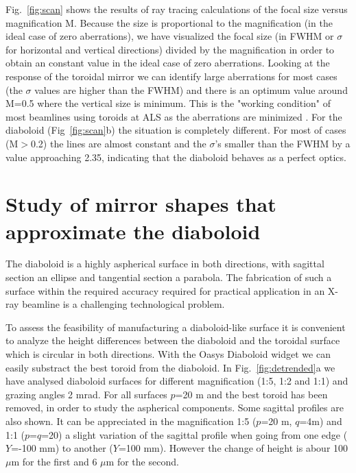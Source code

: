 \documentclass{iucr}              %
\begin{document}
Fig.~\ref{fig:scan} shows the results of ray tracing calculations of the focal size versus magnification M. Because the size is proportional to the magnification (in the ideal case of zero aberrations), we have visualized the focal size (in FWHM or $\sigma$ for horizontal and vertical directions) divided by the magnification in order to obtain an constant value in the ideal case of zero aberrations. Looking at the response of the toroidal mirror we can identify large aberrations for most cases (the $\sigma$ values are higher than the FWHM) and there is an optimum value around M=0.5 where the vertical size is minimum. This is the "working condition" of most beamlines using toroids at ALS as the aberrations are minimized \cite{MacDowell2004}. For the diaboloid (Fig~\ref{fig:scan}b) the situation is completely different. For most of cases (M$>$0.2) the lines are almost constant and the $\sigma$'s smaller than the FWHM by a value approaching 2.35, indicating that the diaboloid behaves as a perfect optics. 


\section{Study of mirror shapes that approximate the diaboloid}
\label{sec:approximatedShapes}

The diaboloid is a highly aspherical surface in both directions, with sagittal section an ellipse and tangential section a parabola. The fabrication of such a surface within the required accuracy required for practical application in an X-ray beamline is a challenging technological problem. 


To assess the feasibility of manufacturing a diaboloid-like surface it is convenient to analyze the height differences between the diaboloid and the toroidal surface which is circular in both directions. With the Oasys Diaboloid widget we can easily substract the best toroid from the diaboloid. In Fig.~\ref{fig:detrended}a we have analysed diaboloid surfaces for different magnification (1:5, 1:2 and 1:1) and grazing angles 2 mrad. For all surfaces $p$=20 m and the best toroid has been removed, in order to study the aspherical components. Some sagittal profiles are also shown. It can be appreciated in the magnification 1:5 ($p$=20 m, $q$=4m) and 1:1 ($p$=$q$=20) a slight variation of the sagittal profile when going from one edge ($Y$=-100 mm) to another ($Y$=100 mm). However the change of height is abour 100 $\mu$m for the first and 6 $\mu$m for the second. 
\end{document}
